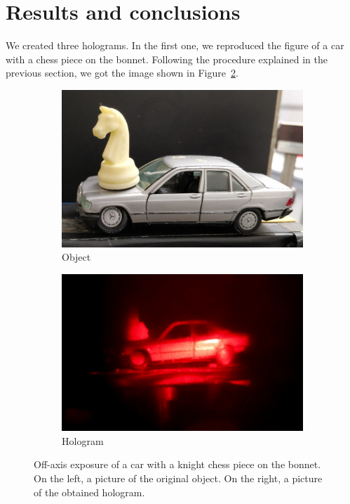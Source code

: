 \documentclass[11pt,a4paper]{article}
\begin{document}
\newpage
\section{Results and conclusions}

We created three holograms. In the first one, we reproduced the figure of a car with a chess piece on the bonnet. Following the procedure explained in the previous section, we got the image shown in Figure~\ref{fig:off_axis_hologram1}.
\begin{figure}[ht]
\centering
\begin{subfigure}[b]{0.45\textwidth}
\includegraphics[width=\textwidth]{car_knight}
\caption{Object}
\label{fig:car_knight1}
\end{subfigure}
\begin{subfigure}[b]{0.45\textwidth}
\includegraphics[width=\textwidth]{Off-axis_hologram}
\caption{Hologram}
\label{fig:off_axis_hologram1}
\end{subfigure}
\caption{Off-axis exposure of a car with a knight chess piece on the bonnet. On the left, a picture of the original object. On the right, a picture of the obtained hologram.}
\label{fig:off-axis_exposure}
\end{figure}
\end{document}
